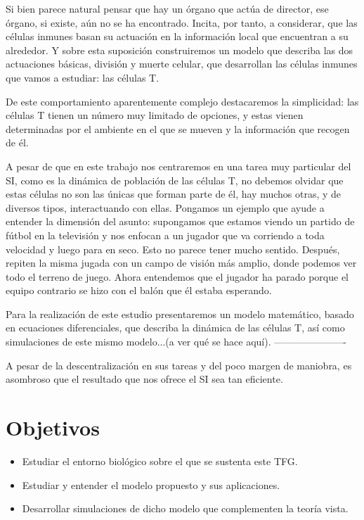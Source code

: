 Si bien parece natural pensar que hay un órgano que actúa de director, ese
órgano, si existe, aún no se ha encontrado. Incita, por tanto, a considerar, que las
células inmunes basan su actuación en la información local que encuentran a su
alrededor. Y sobre esta suposición construiremos un modelo que describa las
dos actuaciones básicas, división y muerte celular, que desarrollan las células inmunes que vamos a estudiar: las células T.

De este comportamiento aparentemente complejo destacaremos la simplicidad: las células T tienen un número muy limitado de opciones, y estas vienen determinadas por el ambiente en el que se mueven y la información que recogen de él.


A pesar de que en este trabajo nos centraremos en una tarea muy particular del SI, como es la dinámica de población de las células T, no debemos olvidar que estas células no son las únicas que forman parte de él, hay muchos otras, y de diversos tipos, interactuando con ellas. Pongamos un ejemplo que ayude a entender la dimensión del asunto: supongamos que estamos viendo un partido de fútbol en la televisión y nos enfocan a un jugador que va corriendo a toda velocidad y luego para en seco. Esto no parece tener mucho sentido. Después, repiten la misma jugada con un campo de visión más amplio, donde podemos ver todo el terreno de juego. Ahora entendemos que el jugador ha parado porque el equipo contrario se hizo con el balón que él estaba esperando. 

Para la realización de este estudio presentaremos un modelo matemático, basado en ecuaciones diferenciales, que describa la dinámica de las células T, así como simulaciones de este mismo modelo...(a ver qué se hace aquí).
----------------------

A pesar de la descentralización en sus tareas y del poco margen de maniobra, es asombroso que el resultado que nos ofrece el SI sea tan eficiente.

\section{Objetivos}
 \begin{itemize}
 	\item Estudiar el entorno biológico sobre el que se sustenta este TFG.
 	\item Estudiar y entender el modelo propuesto y sus aplicaciones. 
 	\item Desarrollar simulaciones de dicho modelo que complementen la teoría vista.
 \end{itemize}


